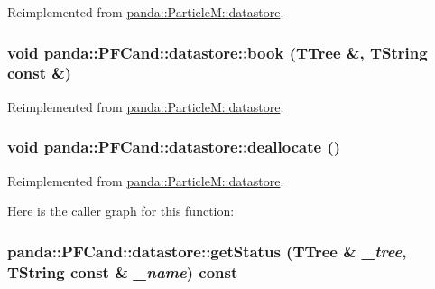 Reimplemented from \hyperlink{structpanda_1_1ParticleM_1_1datastore_aafc17a88cf8425ff45a00b5fd2eb5751}{panda::ParticleM::datastore}.\hypertarget{structpanda_1_1PFCand_1_1datastore_a7714d44e5c6b0017ab72d596c83b474b}{
\subsubsection[{book}]{\setlength{\rightskip}{0pt plus 5cm}void panda::PFCand::datastore::book (TTree \&, \/  TString const \&)}}
\label{structpanda_1_1PFCand_1_1datastore_a7714d44e5c6b0017ab72d596c83b474b}


Reimplemented from \hyperlink{structpanda_1_1ParticleM_1_1datastore_ae2eb76ca042d8b3e899c027ee07b5860}{panda::ParticleM::datastore}.\hypertarget{structpanda_1_1PFCand_1_1datastore_ac7084e2d45811f6909e8c65c20941107}{
\subsubsection[{deallocate}]{\setlength{\rightskip}{0pt plus 5cm}void panda::PFCand::datastore::deallocate ()}}
\label{structpanda_1_1PFCand_1_1datastore_ac7084e2d45811f6909e8c65c20941107}


Reimplemented from \hyperlink{structpanda_1_1ParticleM_1_1datastore_a85c4ce11f1d7c6944a525ad2488880aa}{panda::ParticleM::datastore}.

Here is the caller graph for this function:\hypertarget{structpanda_1_1PFCand_1_1datastore_a117b3a740a7d57118a35816456118685}{
\subsubsection[{getStatus}]{ panda::PFCand::datastore::getStatus (TTree \& {\em \_\-tree}, \/  TString const \& {\em \_\-name}) const}}
\label{structpanda_1_1PFCand_1_1datastore_a117b3a740a7d57118a35816456118685}



